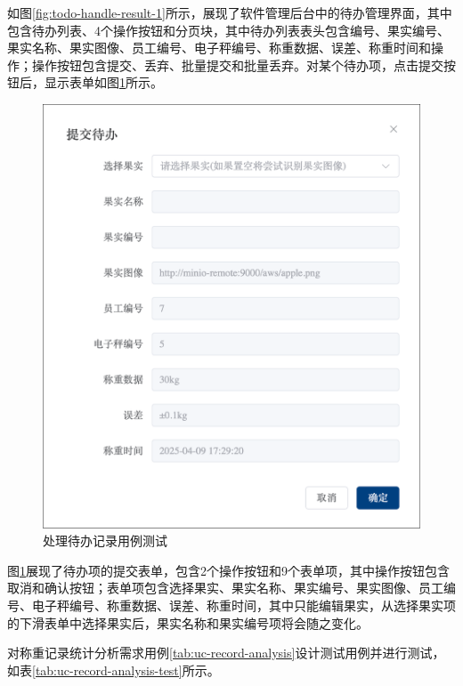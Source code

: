 如图\ref{fig:todo-handle-result-1}所示，展现了软件管理后台中的待办管理界面，其中包含待办列表、4个操作按钮和分页块，其中待办列表表头包含编号、果实编号、果实名称、果实图像、员工编号、电子秤编号、称重数据、误差、称重时间和操作；操作按钮包含提交、丢弃、批量提交和批量丢弃。对某个待办项，点击提交按钮后，显示表单如图\ref{fig:todo-handle-result-2}所示。

\begin{figure}[H]
    \centering
    \includegraphics[width=0.8\linewidth]{../result/todo-handle-result-2.png}
    \caption{处理待办记录用例测试}
    \label{fig:todo-handle-result-2}
\end{figure}

图\ref{fig:todo-handle-result-2}展现了待办项的提交表单，包含2个操作按钮和9个表单项，其中操作按钮包含取消和确认按钮；表单项包含选择果实、果实名称、果实编号、果实图像、员工编号、电子秤编号、称重数据、误差、称重时间，其中只能编辑果实，从选择果实项的下滑表单中选择果实后，果实名称和果实编号项将会随之变化。

对称重记录统计分析需求用例\ref{tab:uc-record-analysis}设计测试用例并进行测试，如表\ref{tab:uc-record-analysis-test}所示。


